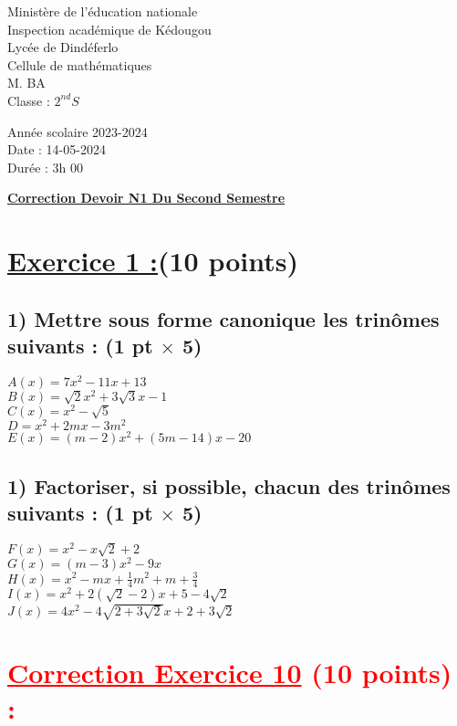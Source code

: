\documentclass[12pt]{article}
\begin{document}
\begin{minipage}{0.5\textwidth}
	Ministère de l'éducation nationale  \\
	Inspection académique de Kédougou   \\
	Lycée de Dindéferlo            \\
	Cellule de mathématiques            \\
	M. BA                          \\
	Classe : $2^{nd}S$  \\
\end{minipage}
\begin{minipage}{0.5\textwidth}
	Année scolaire 2023-2024 \\
	Date : 14-05-2024 \\
	Durée : 3h 00 \\
\end{minipage}

\begin{center}
	\textbf{{\underline{Correction Devoir N1 Du Second Semestre}}}
\end{center}

\section*{\underline{Exercice 1 :}(10 points)}
\subsection*{1) Mettre sous forme canonique les trinômes suivants : (1 pt $\times$ 5)}
$A(x) = 7x^{2}-11x + 13$\\
$B(x) =\sqrt{2}x^{2}+3\sqrt{3}x-1$\\
$C(x) =x^{2}-\sqrt{5}$\\
$D =x^{2} + 2mx-3m^{2}$\\
$E(x) =(m-2)x^{2}+(5m-14)x-20$
\subsection*{1) Factoriser, si possible, chacun des trinômes suivants : (1 pt $\times$ 5)}
$F(x) =x^{2}-x\sqrt{2}+2$\\
$G(x)=(m-3)x^{2}-9x$\\ 
$H(x)=x^{2}-mx +\frac{1}{4}m^{2}+m+\frac{3}{4}$\\ 
$I(x)= x^{2} + 2(\sqrt{2}-2)x+5-4\sqrt{2}$\\ 
$J(x)=4x^{2}-4\sqrt{2+3\sqrt{2}}x+2+3\sqrt{2}$\\
\section*{\textcolor{red}{\underline{Correction Exercice 10} (10 points) :}}
\end{document}
